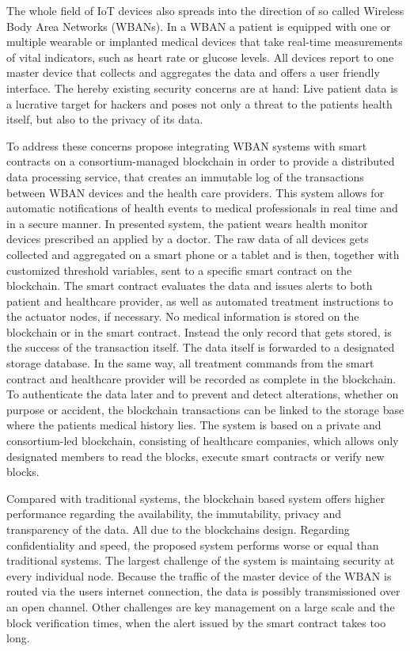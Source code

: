 The whole field of IoT devices also spreads into the direction of so called Wireless Body Area Networks (WBANs). In a WBAN a patient is equipped with one or multiple wearable or implanted medical devices that take real-time measurements of vital indicators, such as heart rate or glucose levels. All devices report to one master device that collects and aggregates the data and offers a user friendly interface. 
The hereby existing security concerns are at hand: Live patient data is a lucrative target for hackers and poses not only a threat to the patients health itself, but also to the privacy of its data.

To address these concerns \citeauthor{Baccarini2018} propose integrating WBAN systems with smart contracts on a consortium-managed blockchain in order to provide a distributed data processing service, that creates an immutable log of the transactions between WBAN devices and the health care providers. This system allows for automatic notifications of health events to medical professionals in real time and in a secure manner. 
In presented system, the patient wears health monitor devices prescribed an applied by a doctor. The raw data of all devices gets collected and aggregated on a smart phone or a tablet and is then, together with customized threshold variables, sent to a specific smart contract on the blockchain. The smart contract evaluates the data and issues alerts to both patient and healthcare provider, as well as automated treatment instructions to the actuator nodes, if necessary.
No medical information is stored on the blockchain or in the smart contract. Instead the only record that gets stored, is the success of the transaction itself. The data itself is forwarded to a designated storage database. In the same way, all treatment commands from the smart contract and healthcare provider will be recorded as complete in the blockchain.
To authenticate the data later and to prevent and detect alterations, whether on purpose or accident, the blockchain transactions can be linked to the storage base where the patients medical history lies.
The system is based on a private and consortium-led blockchain, consisting of healthcare companies, which allows only designated members to read the blocks, execute smart contracts or verify new blocks.

Compared with traditional systems, the blockchain based system offers higher performance regarding the availability, the immutability, privacy and transparency of the data. All due to the blockchains design. Regarding confidentiality and speed, the proposed system performs worse or equal than traditional systems.
The largest challenge of the system is maintaing security at every individual node. Because the traffic of the master device of the WBAN is routed via the users internet connection, the data is possibly transmissioned over an open channel.  Other challenges are key management on a large scale and the block verification times, when the alert issued by the smart contract takes too long.

